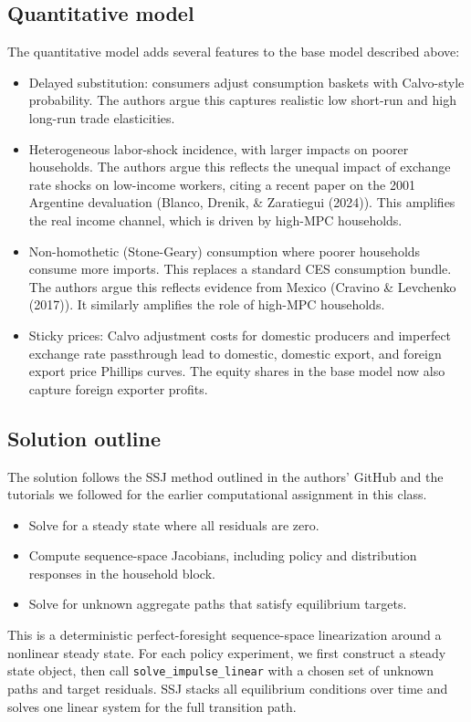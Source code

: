 \documentclass[12pt]{article}
\begin{document}
\subsection{Quantitative model}
The quantitative model adds several features to the base model described above:
\begin{itemize}
  \item Delayed substitution: consumers adjust consumption baskets with Calvo-style probability. The authors argue this captures realistic low short-run and high long-run trade elasticities.
  \item Heterogeneous labor-shock incidence, with larger impacts on poorer households. The authors argue this reflects the unequal impact of exchange rate shocks on low-income workers, citing a recent paper on the 2001 Argentine devaluation (Blanco, Drenik, \& Zaratiegui (2024)). This amplifies the real income channel, which is driven by high-MPC households.
  \item Non-homothetic (Stone-Geary) consumption where poorer households consume more imports. This replaces a standard CES consumption bundle. The authors argue this reflects evidence from Mexico (Cravino \& Levchenko (2017)). It similarly amplifies the role of high-MPC households.
  \item Sticky prices: Calvo adjustment costs for domestic producers and imperfect exchange rate passthrough lead to domestic, domestic export, and foreign export price Phillips curves. The equity shares in the base model now also capture foreign exporter profits.
\end{itemize}



\subsection{Solution outline}
The solution follows the SSJ method outlined in the authors' GitHub and the tutorials we followed for the earlier computational assignment in this class.
\begin{itemize}
  \item Solve for a steady state where all residuals are zero.
  \item Compute sequence-space Jacobians, including policy and distribution responses in the household block.
  \item Solve for unknown aggregate paths that satisfy equilibrium targets.
\end{itemize}
This is a deterministic perfect-foresight sequence-space linearization around a nonlinear steady state. For each policy experiment, we first construct a steady state object, then call \texttt{solve\_impulse\_linear} with a chosen set of unknown paths and target residuals. SSJ stacks all equilibrium conditions over time and solves one linear system for the full transition path.
\end{document}
